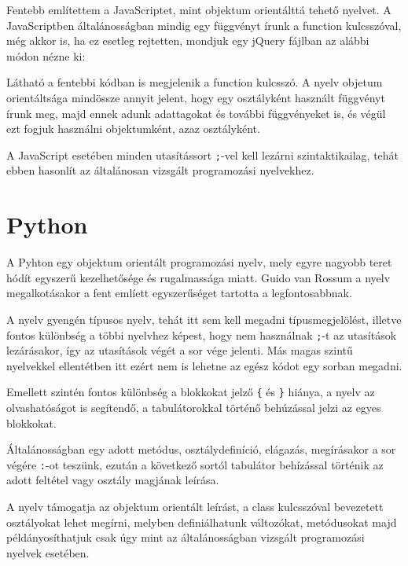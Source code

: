 Fentebb említettem a JavaScriptet, mint objektum orientálttá tehető nyelvet. A JavaScriptben általánosságban mindig egy függvényt írunk a function kulcsszóval, még akkor is, ha ez esetleg rejtetten, mondjuk egy jQuery fájlban az alábbi módon nézne ki:


Látható a fentebbi kódban is megjelenik a function kulcsszó. A nyelv objetum orientáltsága mindössze annyit jelent, hogy egy osztályként használt függvényt írunk meg, majd ennek adunk adattagokat és további függvényeket is, és végül ezt fogjuk használni objektumként, azaz osztályként.

A JavaScript esetében minden utasítássort \texttt{;}-vel kell lezárni szintaktikailag, tehát ebben hasonlít az általánosan vizsgált programozási nyelvekhez.

\section{Python}

A Pyhton egy objektum orientált programozási nyelv, mely egyre nagyobb teret hódít egyszerű kezelhetősége és rugalmassága miatt. Guido van Rossum a nyelv megalkotásakor a fent emlíett egyszerűséget tartotta a legfontosabbnak.

A nyelv gyengén típusos nyelv, tehát itt sem kell megadni típusmegjelölést, illetve fontos különbség a többi nyelvhez képest, hogy nem használnak \texttt{;}-t az utasítások lezárásakor, így az utasítások végét a sor vége jelenti. Más magas szintű nyelvekkel ellentétben itt ezért nem is lehetne az egész kódot egy sorban megadni.

Emellett szintén fontos különbség a blokkokat jelző \texttt{\{} és \texttt{\}} hiánya, a nyelv az olvashatóságot is segítendő, a tabulátorokkal történő behúzással jelzi az egyes blokkokat.

Általánosságban egy adott metódus, osztálydefiníció, elágazás, megírásakor a sor végére \texttt{:}-ot teszünk, ezután a következő sortól tabulátor behízással történik az adott feltétel vagy osztály magjának leírása.

A nyelv támogatja az objektum orientált leírást, a class kulcsszóval bevezetett osztályokat lehet megírni, melyben definiálhatunk változókat, metódusokat majd példányosíthatjuk csak úgy mint az általánosságban vizsgált programozási nyelvek esetében.

